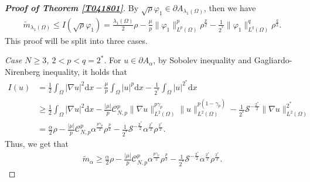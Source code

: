 \documentclass[10pt]{article}
\numberwithin{equation}{section}
\newcommand{\ud}{\mathrm{d}}
\numberwithin{equation}{section}
\begin{document}
\begin{proof}[\bf Proof of Theorem \ref{T041801}]
By $\sqrt{\rho}\varphi_1 \in \partial A_{\lambda_1(\Omega)}$,  then we have
\begin{equation}\label{2505211445}
\begin{aligned}
\widetilde{m}_{\lambda_1(\Omega)}\leq I(\sqrt{\rho}\varphi_1)
=\frac{\lambda_1(\Omega)}{2}\rho
-\frac{\mu}{p}\|\varphi_1\|^p_{L^{p}(\Omega)}\rho^{\frac{p}{2}}
-\frac{1}{2^{*}}\|\varphi_1\|^{q}_{L^{q}(\Omega)}\rho^{\frac{q}{2}}.
\end{aligned}
\end{equation}
This proof will be split into three cases.
\smallskip

{\it Case $N\ge 3$, $2<p<q=2^*$}. For $u\in \partial A_{\alpha}$, by Sobolev inequality and Gagliardo-Nirenberg inequality, it holds that
\begin{equation}\label{25052719099}
\begin{aligned}
I(u)&=\frac{1}{2}\int_{\Omega}|\nabla u|^2 \ud x
-\frac{\mu}{p}\int_{\Omega}|u|^{p} \ud x
-\frac{1}{2^{*}}\int_{\Omega}|u|^{2^{*}} \ud x\\
&\geq \frac{1}{2}\int_{\Omega}|\nabla u|^2 \ud x
-\frac{|\mu|}{p}\mathcal{C}^{p}_{N,p}\|\nabla u\|^{p\gamma_{p}}_{L^{2}(\Omega)}
\|u\|^{p(1-\gamma_{p})}_{L^{2}(\Omega)}
-\frac{1}{2^{*}}\mathcal{S}^{-\frac{2^{*}}{2}}\|\nabla u\|^{2^{*}}_{L^{2}(\Omega)}\\
&=\frac{\alpha}{2}\rho
-\frac{|\mu|}{p}\mathcal{C}^{p}_{N,p}\alpha^{\frac{p\gamma_{p}}{2}}\rho^{\frac{p}{2}}
-\frac{1}{2^{*}}\mathcal{S}^{-\frac{2^{*}}{2}}\alpha^{\frac{2^{*}}{2}}\rho^{\frac{2^{*}}{2}}.
\end{aligned}
\end{equation}
Thus, we get that
\begin{equation}\label{2505211446}
\begin{aligned}
\widetilde{m}_{\alpha}\geq
\frac{\alpha}{2}\rho
-\frac{|\mu|}{p}\mathcal{C}^{p}_{N,p}\alpha^{\frac{p\gamma_{p}}{2}}\rho^{\frac{p}{2}}
-\frac{1}{2^{*}}\mathcal{S}^{-\frac{2^{*}}{2}}\alpha^{\frac{2^{*}}{2}}\rho^{\frac{2^{*}}{2}}.
\end{aligned}
\end{equation}


\end{proof}
\end{document}
